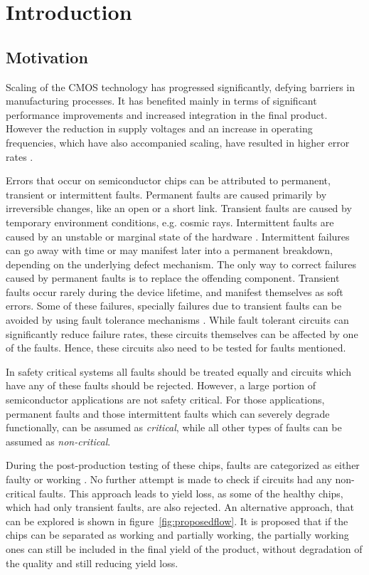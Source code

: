 \chapter{Introduction}

\section{Motivation}
Scaling of the CMOS technology has progressed significantly, defying barriers in manufacturing processes. It has benefited mainly in terms of significant performance improvements and increased integration in the final product. However the reduction in supply voltages and an increase in operating frequencies, which have also accompanied scaling, have resulted in higher error rates \cite{Srinivasan2004, Constantinescu2007, Agostinelli2005}.

Errors that occur on semiconductor chips  can be attributed to permanent, transient or intermittent faults. Permanent faults are caused primarily by irreversible changes, like an open or a short link. Transient faults are caused by temporary environment conditions, e.g. cosmic rays. Intermittent faults are caused by an unstable or marginal state of the hardware \cite{Constantinescu2007}. Intermittent failures can go away with time or may manifest later into a permanent breakdown, depending on the underlying defect mechanism. The only way to correct failures caused by permanent faults is to replace the offending component.  Transient faults occur rarely during the device lifetime, and manifest themselves as soft errors. Some of these failures, specially  failures due to transient faults can be avoided by using fault tolerance mechanisms \cite{Bartlett2004, Mitra2008}. While fault tolerant circuits can significantly reduce failure rates, these circuits themselves can be affected by one of the faults. Hence, these circuits also need to be tested for faults mentioned.

In safety critical systems all faults should be treated equally and circuits which have any of these faults should be rejected. However, a large portion of semiconductor applications are not safety critical. For those applications, permanent faults and those intermittent faults which can severely degrade functionally, can be assumed as \emph{critical}, while all other types of faults can be assumed as \emph{non-critical}.

During the post-production testing of these chips, faults are categorized as either faulty or working \cite{Agrawal2000}. No further attempt is made to check if circuits had any non-critical faults. This approach leads to yield loss, as some of the healthy chips, which had only transient faults, are also rejected. An alternative approach, that can be explored is shown in figure~\ref{fig:proposedflow}. It is proposed that if the chips can be separated as working and partially working, the partially working ones can still be included in the final yield of the product, without degradation of the quality and still reducing yield loss.

